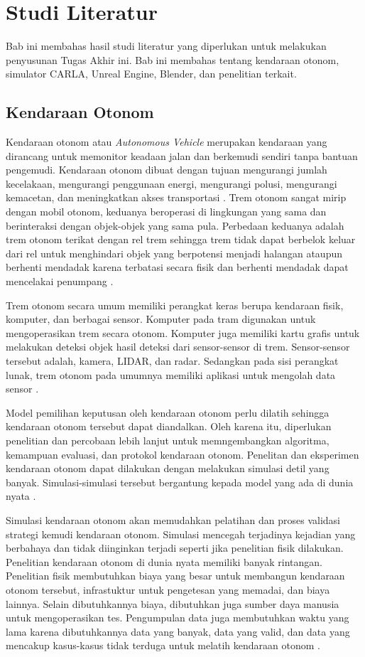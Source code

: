 \chapter{Studi Literatur}

Bab ini membahas hasil studi literatur yang diperlukan untuk melakukan
penyusunan Tugas Akhir ini. Bab ini membahas tentang kendaraan otonom, simulator
CARLA, Unreal Engine, Blender, dan penelitian terkait.

\section{Kendaraan Otonom}
Kendaraan otonom atau \textit{Autonomous Vehicle} merupakan kendaraan yang
dirancang untuk memonitor keadaan jalan dan berkemudi sendiri tanpa bantuan
pengemudi. Kendaraan otonom dibuat dengan tujuan mengurangi jumlah kecelakaan,
mengurangi penggunaan energi, mengurangi polusi, mengurangi kemacetan, dan
meningkatkan akses transportasi \parencite{av-bagloee}. Trem otonom sangat mirip
dengan mobil otonom, keduanya beroperasi di lingkungan yang sama dan
berinteraksi dengan objek-objek yang sama pula. Perbedaan keduanya adalah trem
otonom terikat dengan rel trem sehingga trem tidak dapat berbelok keluar dari
rel untuk menghindari objek yang berpotensi menjadi halangan ataupun berhenti
mendadak karena terbatasi secara fisik dan berhenti mendadak dapat mencelakai
penumpang \parencite{at-palmer}.

Trem otonom secara umum memiliki perangkat keras berupa kendaraan fisik,
komputer, dan berbagai sensor. Komputer pada tram digunakan untuk mengoperasikan
trem secara otonom. Komputer juga memiliki kartu grafis untuk melakukan deteksi
objek hasil deteksi dari sensor-sensor di trem. Sensor-sensor tersebut adalah,
kamera, LIDAR, dan radar. Sedangkan pada sisi perangkat lunak, trem otonom pada
umumnya memiliki aplikasi untuk mengolah data sensor \parencite{at-palmer}.

Model pemilihan keputusan oleh kendaraan otonom perlu dilatih sehingga kendaraan
otonom tersebut dapat diandalkan. Oleh karena itu, diperlukan penelitian dan
percobaan lebih lanjut untuk memngembangkan algoritma, kemampuan evaluasi, dan
protokol kendaraan otonom. Penelitan dan eksperimen kendaraan otonom dapat
dilakukan dengan melakukan simulasi detil yang banyak. Simulasi-simulasi
tersebut bergantung kepada model yang ada di dunia nyata \parencite{av-berger}.

Simulasi kendaraan otonom akan memudahkan pelatihan dan proses validasi strategi
kemudi kendaraan otonom. Simulasi mencegah terjadinya kejadian yang berbahaya
dan tidak diinginkan terjadi seperti jika penelitian fisik dilakukan. Penelitian
kendaraan otonom di dunia nyata memiliki banyak rintangan. Penelitian fisik
membutuhkan biaya yang besar untuk membangun kendaraan otonom tersebut,
infrastuktur untuk pengetesan yang memadai, dan biaya lainnya. Selain
dibutuhkannya biaya, dibutuhkan juga sumber daya manusia untuk mengoperasikan
tes. Pengumpulan data juga membutuhkan waktu yang lama karena dibutuhkannya data
yang banyak, data yang valid, dan data yang mencakup kasus-kasus tidak terduga
untuk melatih kendaraan otonom \parencite{carla-dosovitskiy}.

